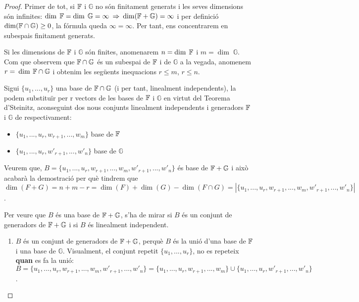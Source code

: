 \begin{proof}
Primer de tot, si $\mathbb{F}$ i $\mathbb{G}$ no són finitament generats i les seves dimensions són infinites: $\dim\;\mathbb{F} = \dim\;\mathbb{G} = \infty \: \Rightarrow \: \dim(\mathbb{F}+\mathbb{G}) = \infty$ i per definició $\dim(\mathbb{F}\cap\mathbb{G}) \geq 0$, la fórmula queda $\infty = \infty$. Per tant, ens concentrarem en subespais finitament generats.


Si les dimensions de $\mathbb{F}$ i $\mathbb{G}$ són finites, anomenarem $n = \dim\;\mathbb{F}$ i $m = \dim\;\mathbb{G}$. Com que observem que $\mathbb{F}\cap\mathbb{G}$ és un subespai de $\mathbb{F}$ i de $\mathbb{G}$ a la vegada, anomenem $r = \:\dim\:\mathbb{F}\cap\mathbb{G}$ i obtenim les següents inequacions $r \leq m$, $r \leq n$.


Sigui $\{u_1,...,u_r\}$ una base de $\mathbb{F}\cap\mathbb{G}$ (i per tant, linealment independents), la podem substituïr per r vectors de les bases de $\mathbb{F}$ i $\mathbb{G}$ en virtut del Teorema d'Steinitz, aconseguint dos nous conjunts linealment independents i generadors $\mathbb{F}$ i $\mathbb{G}$ de respectivament:
\begin{itemize}
    \item $\{u_1,...,u_r, w_{r+1}, ..., w_m\}$ base de $\mathbb{F}$
    \item $\{u_1,...,u_r,w'_{r+1},...,w'_n\}$ base de $\mathbb{G}$
\end{itemize}    
Veurem que, $B = \{u_1,...,u_r, w_{r+1}, ..., w_m, w'_{r+1},...,w'_n\}$ és base de $\mathbb{F}+\mathbb{G}$ i això acabarà la demostració per què tindrem que $\dim(F + G) = n +m- r = \dim(F) + \dim(G) - \dim(F \cap G) = |\{u_1,...,u_r, w_{r+1}, ..., w_m, w'_{r+1},...,w'_n\}|$.


Per veure que $B$ és una base de $\mathbb{F}+\mathbb{G}$, s'ha de mirar si $B$ és un conjunt de generadors de $\mathbb{F}+\mathbb{G}$ i si $B$ és linealment independent.

\begin{enumerate}[(1)]
\item $B$ és un conjunt de generadors de $\mathbb{F}+\mathbb{G}$, perquè $B$ és la unió d'una base de $\mathbb{F}$ i una base de $\mathbb{G}$. Visualment, el conjunt repetit $\{u_1,...,u_r\}$, no es repeteix \textbf{quan} es fa la unió: $B = \{u_1,...,u_r, w_{r+1}, ..., w_m, w'_{r+1},...,w'_n\} = \{u_1,...,u_r, w_{r+1}, ..., w_m\}\cup\{u_1,...,u_r,w'_{r+1},...,w'_n\}$.


\end{enumerate}
\end{proof}
